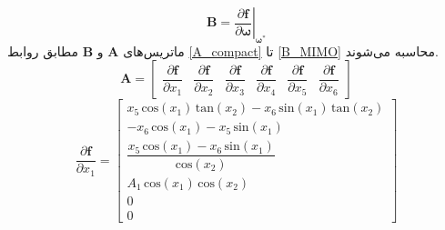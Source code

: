 \begin{equation}
	\boldsymbol B = \left.\dfrac{\partial \boldsymbol f}{\partial \boldsymbol \omega}\right\vert_{\boldsymbol{\omega^*}}
\end{equation}
ماتریس‌های $\boldsymbol A$ و $\boldsymbol B$ مطابق روابط
\ref{A_compact}
تا
\ref{B_MIMO}
محاسبه می‌شوند.
\begin{equation}\label{A_compact}
	\boldsymbol A = \begin{bmatrix}
		\dfrac{\partial \boldsymbol{ f}}{\partial  x_1} &
		\dfrac{\partial \boldsymbol{ f}}{\partial  x_2} &
		\dfrac{\partial \boldsymbol{ f}}{\partial  x_3} &
		\dfrac{\partial \boldsymbol{ f}}{\partial  x_4} &
		\dfrac{\partial \boldsymbol{ f}}{\partial  x_5} &
		\dfrac{\partial \boldsymbol{ f}}{\partial  x_6} 
	\end{bmatrix}
\end{equation}
\begin{equation}
	 \dfrac{\partial \boldsymbol{ f}}{\partial  x_1} = 
	 \begin{bmatrix}
	 	x_5 \,\mathrm{cos}\left(x_1 \right)\,\mathrm{tan}\left(x_2 \right)-x_6 \,\mathrm{sin}\left(x_1 \right)\,\mathrm{tan}\left(x_2 \right)\\
	 	-x_6 \,\mathrm{cos}\left(x_1 \right)-x_5 \,\mathrm{sin}\left(x_1 \right)\\[0.5em]
	 	\dfrac{x_5 \,\mathrm{cos}\left(x_1 \right)-x_6 \,\mathrm{sin}\left(x_1 \right)}{\mathrm{cos}\left(x_2 \right)}\\
	 	A_1 \,\mathrm{cos}\left(x_1 \right)\,\mathrm{cos}\left(x_2 \right)\\
	 	0\\
	 	0
	 \end{bmatrix}
\end{equation}
